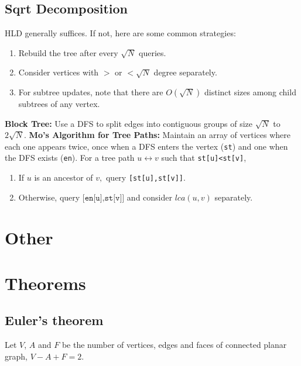     \subsection{Sqrt Decomposition}
		\vspace{-0.2em}
		HLD generally suffices. If not, here are some common strategies:
		\begin{enumerate}
			\itemsep-0.8em
			\item Rebuild the tree after every $\sqrt N$ queries. 
			\item Consider vertices with $>$ or $<\sqrt N$ degree separately. 
			\item For subtree updates, note that there are $O(\sqrt N)$ distinct sizes among child subtrees of any vertex.
		\end{enumerate}
		\textbf{Block Tree:} Use a DFS to split edges into contiguous groups of size $\sqrt N$ to $2\sqrt N.$
		\textbf{Mo's Algorithm for Tree Paths:} Maintain an array of vertices where each one appears twice, once when a DFS enters the vertex (\texttt{st}) and one when the DFS exists (\texttt{en}). For a tree path $u\leftrightarrow v$ such that \texttt{st[u]<st[v]},
		\begin{enumerate}
			\itemsep-0.8em
			\item If $u$ is an ancestor of $v,$ query \texttt{[st[u],st[v]]}.
			\item Otherwise, query $\texttt{[en[u],st[v]]}$ and consider $lca(u,v)$ separately.
		\end{enumerate}
    
\section{Other}


\section{Theorems}
\subsection{Euler's theorem}
Let $V$, $A$ and $F$ be the number of vertices, edges and faces of connected planar graph, $V - A + F = 2$.

